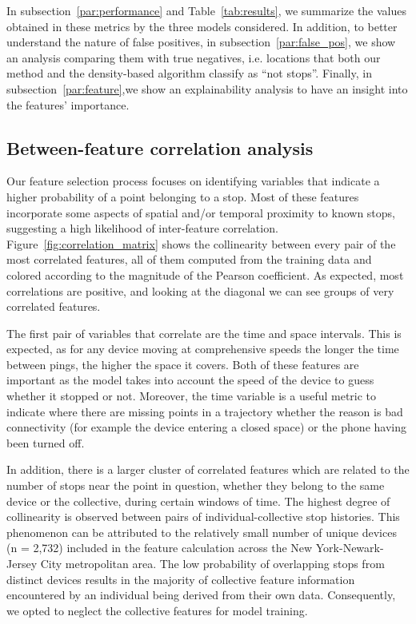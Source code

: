 \documentclass{article}
\begin{document}
In subsection~\ref{par:performance} and Table~\ref{tab:results}, we summarize the values obtained in these metrics by the three models considered. In addition, to better understand the nature of false positives, in subsection~\ref{par:false_pos}, we show an analysis comparing them with true negatives, i.e. locations that both our method and the density-based algorithm classify as ``not stops''.
Finally, in subsection~\ref{par:feature},we show an explainability analysis to have an insight into the features' importance.

\subsection{Between-feature correlation analysis}\label{par:corr}
Our feature selection process focuses on identifying variables that indicate a higher probability of a point belonging to a stop. Most of these features incorporate some aspects of spatial and/or temporal proximity to known stops, suggesting a high likelihood of inter-feature correlation. Figure~\ref{fig:correlation_matrix} shows the collinearity between every pair of the most correlated features, all of them computed from the training data and colored according to the magnitude of the Pearson coefficient. As expected, most correlations are positive, and looking at the diagonal we can see groups of very correlated features.

The first pair of variables that correlate are the time and space intervals. This is expected, as for any device moving at comprehensive speeds the longer the time between pings, the higher the space it covers. Both of these features are important as the model takes into account the speed of the device to guess whether it stopped or not. Moreover, the time variable is a useful metric to indicate where there are missing points in a trajectory whether the reason is bad connectivity (for example the device entering a closed space) or the phone having been turned off.

In addition, there is a larger cluster of correlated features which are related to the number of stops near the point in question, whether they belong to the same device or the collective, during certain windows of time. The highest degree of collinearity is observed between pairs of individual-collective stop histories. This phenomenon can be attributed to the relatively small number of unique devices (n = 2,732) included in the feature calculation across the New York-Newark-Jersey City metropolitan area. The low probability of overlapping stops from distinct devices results in the majority of collective feature information encountered by an individual being derived from their own data. Consequently, we opted to neglect the collective features for model training.
\end{document}
